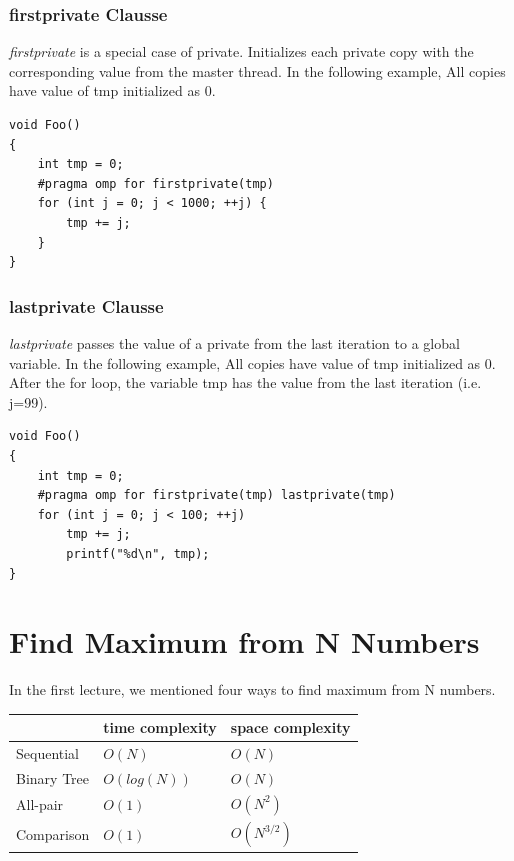 \documentclass[twoside]{article}
\begin{document}
\subsubsection{firstprivate Clausse}
{\it firstprivate} is a special case of private. Initializes each private copy with the corresponding value from the master thread. In the following example, All copies have value of tmp initialized as 0.

\begin{center}
\begin{lstlisting}[linewidth=18cm]
void Foo() 
{ 
    int tmp = 0; 
    #pragma omp for firstprivate(tmp) 
    for (int j = 0; j < 1000; ++j) {
        tmp += j; 
    }
}
\end{lstlisting}
\end{center}

\subsubsection{lastprivate Clausse}
{\it lastprivate} passes the value of a private from the last iteration to a global variable. In the following example, All copies have value of tmp initialized as 0. After the for loop, the variable tmp has the value from the last iteration (i.e. j=99).
\begin{center}
\begin{lstlisting}[linewidth=18cm]
void Foo() 
{ 
    int tmp = 0; 
    #pragma omp for firstprivate(tmp) lastprivate(tmp)
    for (int j = 0; j < 100; ++j) 
        tmp += j; 
        printf("%d\n", tmp);
}
\end{lstlisting}
\end{center}



\section {Find Maximum from N Numbers}
In the first lecture, we mentioned four ways to find maximum from N numbers.

\begin{center}
\begin{tabu} to 0.6\textwidth { | X[l] | X[c] | X[c] |}
 \hline
 & time complexity & space complexity \\
 \hline
 Sequential & $O(N)$ & $O(N)$ \\
 \hline
 Binary Tree  & $O(log(N))$  & $O(N)$  \\
  \hline
 All-pair  & $O(1)$  & $O(N^2)$  \\
  \hline
 Comparison  & $O(1)$  & $O(N^{3/2})$  \\
\hline
\end{tabu}
\end{center}
\end{document}
